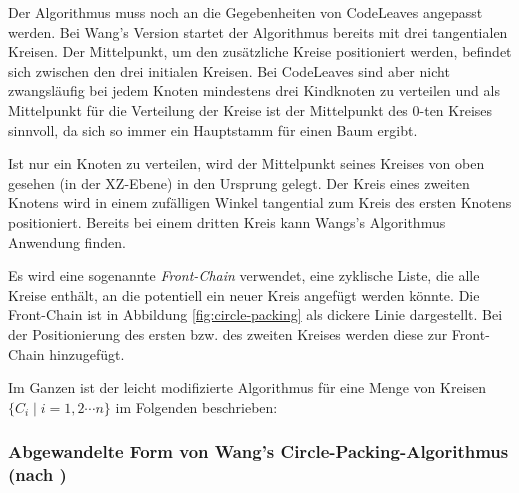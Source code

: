 Der Algorithmus muss noch an die Gegebenheiten von CodeLeaves angepasst werden. Bei Wang's Version startet der Algorithmus bereits mit drei tangentialen Kreisen. Der Mittelpunkt, um den zusätzliche Kreise positioniert werden, befindet sich zwischen den drei initialen Kreisen. Bei CodeLeaves sind aber nicht zwangsläufig bei jedem Knoten mindestens drei Kindknoten zu verteilen und als Mittelpunkt für die Verteilung der Kreise ist der Mittelpunkt des $0$-ten Kreises sinnvoll, da sich so immer ein Hauptstamm für einen Baum ergibt.

Ist nur ein Knoten zu verteilen, wird der Mittelpunkt seines Kreises von oben gesehen (in der XZ-Ebene) in den Ursprung gelegt. Der Kreis eines zweiten Knotens wird in einem zufälligen Winkel tangential zum Kreis des ersten Knotens positioniert. Bereits bei einem dritten Kreis kann Wangs's Algorithmus Anwendung finden.

Es wird eine sogenannte \textit{Front-Chain} verwendet, eine zyklische Liste, die alle Kreise enthält, an die potentiell ein neuer Kreis angefügt werden könnte. Die Front-Chain ist in Abbildung \ref{fig:circle-packing} als dickere Linie dargestellt. Bei der Positionierung des ersten bzw. des zweiten Kreises werden diese zur Front-Chain hinzugefügt.

Im Ganzen ist der leicht modifizierte Algorithmus für eine Menge von Kreisen $\lbrace C_i \mid i = 1, 2 \cdots n \rbrace$ im Folgenden beschrieben:

\subsubsection*{Abgewandelte Form von Wang's Circle-Packing-Algorithmus (nach \cite{wang2006visualization})}

